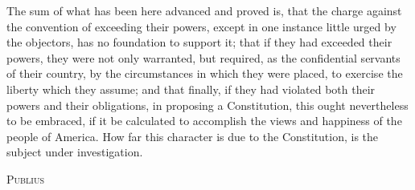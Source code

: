 The sum of what has been here advanced and proved is, that the charge against the convention of exceeding their powers, except in one instance little urged by the objectors, has no foundation to support it; that if they had exceeded their powers, they were not only warranted, but required, as the confidential servants of their country, by the circumstances in which they were placed, to exercise the liberty which they assume; and that finally, if they had violated both their powers and their obligations, in proposing a Constitution, this ought nevertheless to be embraced, if it be calculated to accomplish the views and happiness of the people of America. 
How far this character is due to the Constitution, is the subject under investigation.

\vspace{.5cm}
\textsc{Publius}

\vspace{1.5cm}

